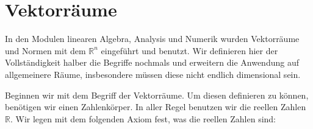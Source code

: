 \documentclass[letterpaper,10pt,english]{jupyterBook}
\begin{document}
\section{Vektorräume}
\label{\detokenize{Funktionalanalysis/GrundlegendeRaeume:vektorraume}}
In den Modulen linearen Algebra, Analysis und Numerik wurden Vektorräume und Normen mit dem \(\mathbb{R}^n\) eingeführt und benutzt. Wir definieren hier der Vollständigkeit halber die Begriffe nochmals und erweitern die Anwendung auf allgemeinere Räume, insbesondere müssen diese nicht endlich dimensional sein.

Beginnen wir mit dem Begriff der Vektorräume. Um diesen definieren zu können, benötigen wir einen Zahlenkörper. In aller Regel benutzen wir die reellen Zahlen \(\mathbb{R}\). Wir legen mit dem folgenden Axiom fest, was die reellen Zahlen sind:
\end{document}
